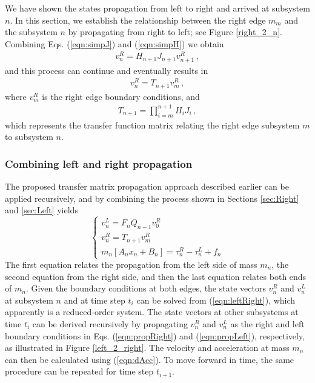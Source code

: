 \documentclass[11pt]{ucthesis}
\newcommand{\beq}{\begin{equation}}
\newcommand{\eeq}{\end{equation}}
\begin{document}
We have shown the states propagation from left to right and arrived at subsystem $n$. In this section, we establish the relationship between the right edge $m_m$ and the subsystem $n$ by propagating from right to left; see Figure \ref{right_2_n}. Combining Eqs. (\ref{eqn:simpJ}) and (\ref{eqn:simpH}) we obtain
\begin{eqnarray}
v_{n}^R = H_{n+1} J_{n+1} v_{n+1}^R \,,
\label{eqn:propLeft}
\end{eqnarray}
and this process can continue and eventually results in
\begin{eqnarray}
v_{n}^R = T_{n+1} v_m^R \,,
\label{eqn:propT}
\end{eqnarray}
where $v_m^R$ is the right edge boundary conditions, and
\begin{eqnarray}
T_{n+1} = \prod_{i = m}^{n+1} H_{i} J_{i} \,,
\end{eqnarray}
which represents the transfer function matrix relating the right edge subsystem $m$ to subsystem $n$.

\subsubsection{Combining left and right propagation}
\label{sec:sim}

The proposed transfer matrix propagation approach described earlier can be applied recursively, and by combining the process shown in Sections \ref{sec:Right} and \ref{sec:Left} yields
\beq  \label{eqn:leftRight}
\left \{ 
\begin{array}{l}
v_n^L = F_n Q_{n-1} v_0^R\\
v_{n}^R = T_{n+1} v_m^R\\
m_n \left [ A_n x_n+ B_n \right ] = \tau_n^R-\tau_n^L +f_n
\end{array}
\right .
\eeq
The first equation relates the propagation from the left side of mass $m_n$, the second equation from the right side, and then the last equation relates both ends of $m_n$. Given the boundary conditions at both edges, the state vectors $v_n^R$ and $v_n^L$ at subsystem $n$ and at time step $t_i$ can be solved from (\ref{eqn:leftRight}), which apparently is a reduced-order system. The state vectors at other subsystems at time $t_i$ can be derived recursively by propagating $v_n^R$ and $v_n^L$ as the right and left boundary conditions in Eqs. (\ref{eqn:propRight}) and (\ref{eqn:propLeft}), respectively, as illustrated in Figure \ref{left_2_right}. The velocity and acceleration at mass $m_n$ can then be calculated using (\ref{eqn:dAcc}). To move forward in time, the same procedure can be repeated for time step $t_{i+1}$. 
\end{document}
